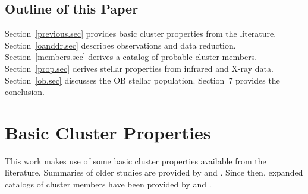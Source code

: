 \documentclass[twocolumn,tighten]{aastex61}
\begin{document}
\subsection{Outline of this Paper}

Section~\ref{previous.sec} provides basic cluster properties from the literature. Section~\ref{oanddr.sec} describes observations and data reduction. Section~\ref{members.sec} derives a catalog of probable cluster members. Section~\ref{prop.sec} derives stellar properties from infrared and X-ray data. Section~\ref{ob.sec} discusses the OB stellar population. Section~7 provides the conclusion. 

\section{Basic Cluster Properties\label{previous.sec}}

This work makes use of some basic cluster properties available from the literature. Summaries of older studies are provided by \citet{2006A&A...454.1047S} and \citet{2008hsf2.book..401R}. Since then, expanded catalogs of cluster members have been provided by \citet{2013AJ....145...37S} and . 
\end{document}
